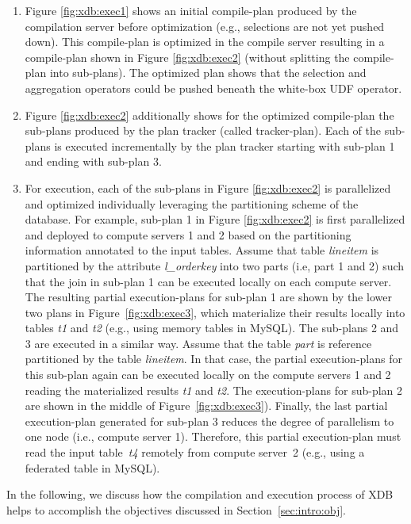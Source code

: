 \documentclass{sig-alternate}
\begin{document}
\begin{enumerate}
\setlength{\itemsep}{-1pt}
\item Figure \ref{fig:xdb:exec1} shows an initial compile-plan produced by the compilation server before optimization (e.g., selections are not yet pushed down). This compile-plan is optimized in the compile server resulting in a compile-plan shown in Figure \ref{fig:xdb:exec2} (without splitting the compile-plan into sub-plans). The optimized plan shows that the selection and aggregation operators could be pushed beneath the white-box UDF operator.
\item Figure \ref{fig:xdb:exec2} additionally shows for the optimized compile-plan the sub-plans produced by the plan tracker (called tracker-plan). Each of the sub-plans is executed incrementally by the plan tracker starting with sub-plan 1 and ending with sub-plan 3.
\item For execution, each of the sub-plans in Figure \ref{fig:xdb:exec2} is parallelized and optimized individually leveraging the partitioning scheme of the database. For example, sub-plan 1 in Figure \ref{fig:xdb:exec2} is first parallelized and deployed to compute servers 1 and 2 based on the partitioning information annotated to the input tables. Assume that table \emph{lineitem} is partitioned by the attribute \emph{l\_orderkey} into two parts (i.e, part 1 and 2) such that the join in sub-plan 1 can be executed locally on each compute server. The resulting partial execution-plans for sub-plan 1 are shown by the lower two plans in Figure~\ref{fig:xdb:exec3}, which materialize their results locally into tables \emph{t1} and \emph{t2} (e.g., using memory tables in MySQL). The sub-plans 2 and 3 are executed in a similar way. Assume that the table \emph{part} is reference partitioned by the table \emph{lineitem}. In that case, the partial execution-plans for this sub-plan again can be executed locally on the compute servers 1 and 2 reading the materialized results \emph{t1} and \emph{t2}. The execution-plans for sub-plan 2 are shown in the middle of Figure~\ref{fig:xdb:exec3}). Finally, the last partial execution-plan generated for sub-plan 3 reduces the degree of parallelism to one node (i.e., compute server 1). Therefore, this partial execution-plan must read the input table~\emph{t4} remotely from compute server~2 (e.g., using a federated table in MySQL). 
\end{enumerate}

In the following, we discuss how the compilation and execution process of XDB helps to accomplish the objectives discussed in Section~\ref{sec:intro:obj}.\\
\end{document}
